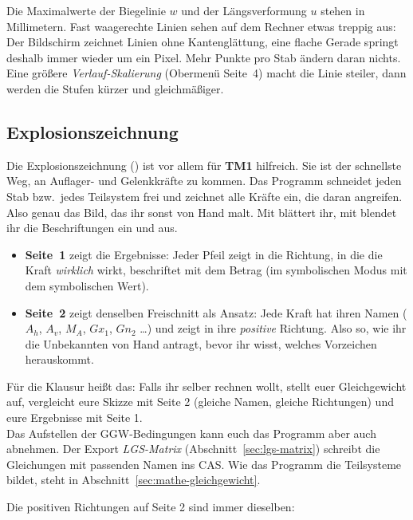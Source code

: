Die Maximalwerte der Biegelinie $w$ und der Längsverformung $u$ stehen in Millimetern.
Fast waagerechte Linien sehen auf dem Rechner etwas treppig aus: Der Bildschirm zeichnet Linien
ohne Kantenglättung, eine flache Gerade springt deshalb immer wieder um ein Pixel. Mehr Punkte
pro Stab ändern daran nichts. Eine größere \emph{Verlauf-Skalierung} (Obermenü Seite~4) macht
die Linie steiler, dann werden die Stufen kürzer und gleichmäßiger.


\subsection{Explosionszeichnung}\label{sec:Explosionszeichnung}

Die Explosionszeichnung () ist vor allem für \textbf{TM1} hilfreich.
Sie ist der schnellste Weg, an Auflager- und Gelenkkräfte zu kommen.
Das Programm schneidet jeden Stab bzw.\ jedes Teilsystem frei und zeichnet alle Kräfte ein, die daran
angreifen. Also genau das Bild, das ihr sonst von Hand malt. Mit  blättert ihr, mit
 blendet ihr die Beschriftungen ein und aus.

\begin{itemize}
  \item \textbf{Seite~1} zeigt die Ergebnisse: Jeder Pfeil zeigt in die Richtung, in die die Kraft
        \emph{wirklich} wirkt, beschriftet mit dem Betrag (im symbolischen Modus mit dem
        symbolischen Wert).
  \item \textbf{Seite~2} zeigt denselben Freischnitt als Ansatz: Jede Kraft hat ihren Namen
        ($A_h$, $A_v$, $M_A$, $Gx_1$, $Gn_2$ \dots) und zeigt in ihre \emph{positive} Richtung.
        Also so, wie ihr die Unbekannten von Hand antragt, bevor ihr wisst, welches Vorzeichen
        herauskommt.
\end{itemize}

Für die Klausur heißt das: Falls ihr selber rechnen wollt, stellt euer Gleichgewicht auf, vergleicht eure Skizze mit Seite 2
(gleiche Namen, gleiche Richtungen) und eure Ergebnisse mit Seite 1.\\
Das Aufstellen der GGW-Bedingungen kann euch das Programm aber auch abnehmen. Der Export \emph{LGS-Matrix}
(Abschnitt~\ref{sec:lgs-matrix}) schreibt die Gleichungen mit passenden Namen ins CAS. Wie
das Programm die Teilsysteme bildet, steht in Abschnitt~\ref{sec:mathe-gleichgewicht}.

Die positiven Richtungen auf Seite 2 sind immer dieselben:


